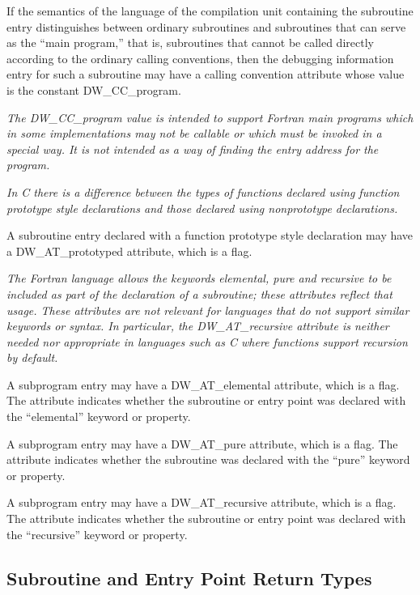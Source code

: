 If the semantics of the language of the compilation unit
containing the subroutine entry distinguishes between ordinary
subroutines and subroutines that can serve as the ``main
program,'' that is, subroutines that cannot be called
directly according to the ordinary calling conventions,
then the debugging information entry for such a subroutine
may have a calling convention attribute whose value is the
constant DW\_CC\_program.

\textit{The DW\_CC\_program value is intended to support Fortran main
programs which in some implementations may not be callable
or which must be invoked in a special way. It is not intended
as a way of finding the entry address for the program.
}

\textit{In C there is a difference between the types of functions
declared using function prototype style declarations and
those declared using non\dash prototype declarations.
}

A subroutine entry declared with a function prototype style
declaration may have a 
DW\-\_AT\-\_prototyped attribute, which is
a flag.

\textit{The Fortran language allows the keywords elemental, pure
and recursive to be included as part of the declaration of
a subroutine; these attributes reflect that usage. These
attributes are not relevant for languages that do not support
similar keywords or syntax. In particular, the DW\_AT\_recursive
attribute is neither needed nor appropriate in languages such
as C where functions support recursion by default.
}

A subprogram entry may have a DW\_AT\_elemental attribute, which
is a flag. The attribute indicates whether the subroutine
or entry point was declared with the ``elemental'' keyword
or property.

A subprogram entry may have a DW\_AT\_pure attribute, which is
a flag. The attribute indicates whether the subroutine was
declared with the ``pure'' keyword or property.

A subprogram entry may have a DW\_AT\_recursive attribute, which
is a flag. The attribute indicates whether the subroutine
or entry point was declared with the ``recursive'' keyword
or property.



\subsection{Subroutine and Entry Point Return Types}
\label{chap:subroutineandentrypointreturntypes}

